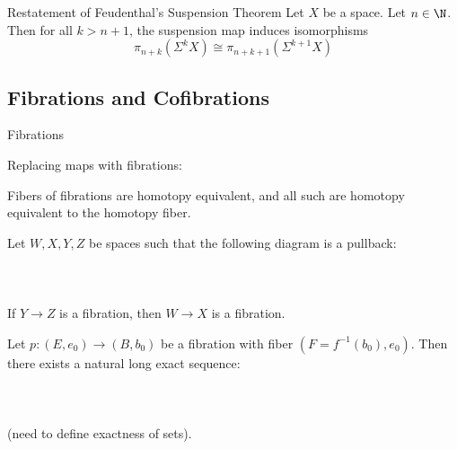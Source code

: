 \documentclass[a4paper]{article}
\begin{document}
\begin{thm}{Restatement of Feudenthal's Suspension Theorem}{} Let $X$ be a space. Let $n\in\N$. Then for all $k>n+1$, the suspension map induces isomorphisms $$\pi_{n+k}(\Sigma^kX)\cong\pi_{n+k+1}(\Sigma^{k+1}X)$$
\end{thm}

\subsection{Fibrations and Cofibrations}
\begin{defn}{Fibrations}{}
\end{defn}

Replacing maps with fibrations: 

\begin{prp}{}{}
\end{prp}

Fibers of fibrations are homotopy equivalent, and all such are homotopy equivalent to the homotopy fiber. 

\begin{lmm}{}{}
\end{lmm}

\begin{prp}{}{} Let $W,X,Y,Z$ be spaces such that the following diagram is a pullback: \\~\\
\\~\\
If $Y\to Z$ is a fibration, then $W\to X$ is a fibration. 
\end{prp}

\begin{prp}{}{} Let $p:(E,e_0)\to(B,b_0)$ be a fibration with fiber $(F=f^{-1}(b_0),e_0)$. Then there exists a natural long exact sequence: \\~\\
\\~\\
(need to define exactness of sets). 
\end{prp}
\end{document}
